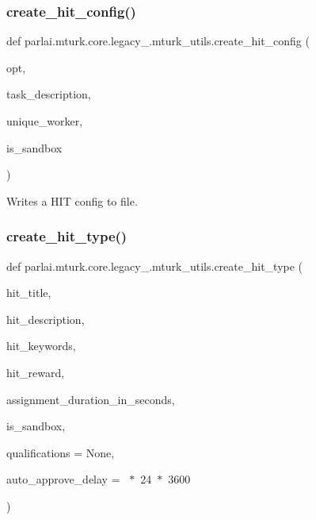\subsubsection{\texorpdfstring{create\+\_\+hit\+\_\+config()}{create\_hit\_config()}}
{\footnotesize\ttfamily def parlai.\+mturk.\+core.\+legacy\+\_.\+mturk\+\_\+utils.\+create\+\_\+hit\+\_\+config (\begin{DoxyParamCaption}\item[{}]{opt,  }\item[{}]{task\+\_\+description,  }\item[{}]{unique\+\_\+worker,  }\item[{}]{is\+\_\+sandbox }\end{DoxyParamCaption})}

\begin{DoxyVerb}Writes a HIT config to file.
\end{DoxyVerb}
 \mbox{\label{namespaceparlai_1_1mturk_1_1core_1_1legacy__2018_1_1mturk__utils_a96dff775cc211227da667088e259c279}} 
\subsubsection{\texorpdfstring{create\+\_\+hit\+\_\+type()}{create\_hit\_type()}}
{\footnotesize\ttfamily def parlai.\+mturk.\+core.\+legacy\+\_.\+mturk\+\_\+utils.\+create\+\_\+hit\+\_\+type (\begin{DoxyParamCaption}\item[{}]{hit\+\_\+title,  }\item[{}]{hit\+\_\+description,  }\item[{}]{hit\+\_\+keywords,  }\item[{}]{hit\+\_\+reward,  }\item[{}]{assignment\+\_\+duration\+\_\+in\+\_\+seconds,  }\item[{}]{is\+\_\+sandbox,  }\item[{}]{qualifications = {\ttfamily None},  }\item[{}]{auto\+\_\+approve\+\_\+delay = {~$\ast$~24~$\ast$~3600} }\end{DoxyParamCaption})}

